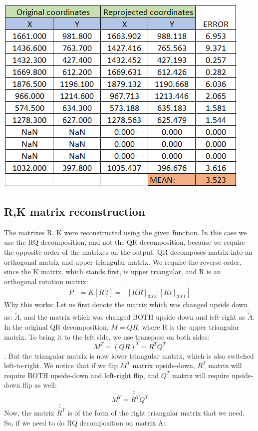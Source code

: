 \documentclass[a4paper]{iacas}
\begin{document}

\vskip 0.1in
\begin{minipage}{\linewidth}
	\centering
	\includegraphics[scale=1]{goal_res/errors_table.png}
	\label{fig_1}
\end{minipage}
\vskip 0.1in



\subsection{R,K matrix reconstruction}
The matrixes R, K were reconstructed using the given function. 
\newline
In this case we use the RQ decomposition, and not the QR decomposition, because we require the opposite order of the matrixes on the output. QR decomposes matrix into an orthogonal matrix and upper triangular matrix. We require the reverse order, since the K matrix, which stands first, is upper triangular, and R is an orthogonal rotation matrix:
\begin{align*}
P &= K [ R | t ] = [[KR]_{3X3} | [Kt]_{3X1} ]
\end{align*}
Why this works:
\newline
Let us first denote the matrix which was changed upside down as: $\tilde{A}$, and the matrix which was changed BOTH upside down and left-right as $\tilde{\tilde{A}}$. 
\newline
In the original QR decomposition, $M = QR$, where R is the upper triangular matrix. To bring it to the left side, we use transpose on both sides: $$M^{T} = (QR)^{T} = R^{T}Q^{T}$$. But the triangular matrix is now lower triangular matrix, which is also switched left-to-right. We notice that if we flip $M^{T}$ matrix upside-down, $R^{T}$ matrix will require BOTH upside-down and left-right flip, and $Q^{T}$ matrix will require upside-down flip as well:
$$\tilde{M^{T}} = \tilde{\tilde{R^{T}}}\tilde{Q^{T}}$$
Now, the matrix $\tilde{\tilde{R^{T}}}$ is of the form of the right triangular matrix that we need.
\newline
So, if we need to do RQ decomposition on matrix A:
\end{document}
